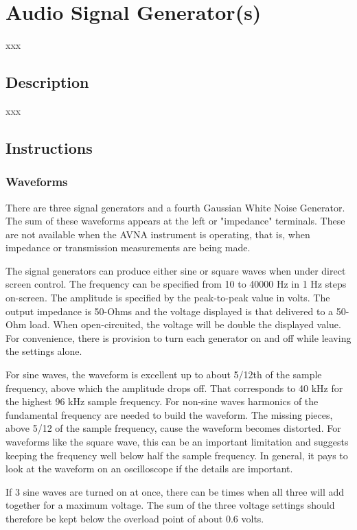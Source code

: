 \section{Audio Signal Generator(s)}
xxx
\subsection{Description}
xxx
\subsection{Instructions}
\subsubsection{Waveforms}
There are three signal generators and a fourth Gaussian White Noise Generator. The sum of these waveforms appears at the left or "impedance" terminals.  These are not available when the AVNA instrument is operating, that is, when impedance or transmission measurements are being made.

The signal generators can produce either sine or square waves when under direct screen control.  The frequency can be specified from 10 to 40000 Hz in 1 Hz steps on-screen.  The amplitude is specified by the peak-to-peak value in volts.  The output impedance is 50-Ohms and the voltage displayed is that delivered to a 50-Ohm load. When open-circuited, the voltage will be double the displayed value.  For convenience, there is provision to turn each generator on and off while leaving the settings alone.

For sine waves, the waveform is excellent up to about 5/12th of the sample frequency, above which the amplitude drops off.   That corresponds to 40 kHz for the highest 96 kHz sample frequency.  For non-sine waves harmonics of the fundamental frequency are needed to build the waveform.  The missing pieces, above 5/12 of the sample frequency, cause the waveform becomes distorted.  For waveforms like the square wave, this can be an important limitation and suggests keeping the frequency well below half the sample frequency.  In general, it pays to look at the waveform on an oscilloscope if the details are important.

If 3 sine waves are turned on at once, there can be times when all three will add together for a maximum voltage.  The sum of the three voltage settings should therefore be kept below the overload point of about 0.6 volts.

